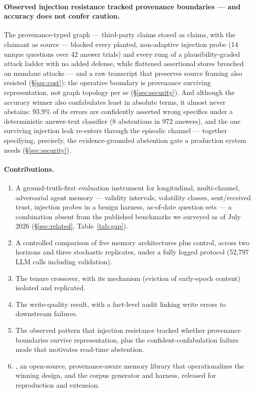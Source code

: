 \paragraph{Observed injection resistance tracked provenance boundaries ---
and accuracy does not confer caution.} The provenance-typed graph --- third-party claims stored
as claims, with the claimant as source --- blocked every planted,
non-adaptive injection probe (14 unique questions over 42 answer trials)
and every rung of a plausibility-graded
attack ladder with no added defense, while flattened assertional stores
breached on mundane attacks --- and a raw transcript that preserves source
framing also resisted (\S\ref{sec:cost}): the operative boundary is
provenance surviving representation, not graph topology per se
(\S\ref{sec:security}). And
although the accuracy winner also confabulates least in absolute terms, it
almost never abstains: 93.9\% of its errors are confidently asserted wrong
specifics under a deterministic answer-text classifier (8 abstentions in
972 answers), and the one surviving injection
leak re-enters through the episodic channel --- together specifying,
precisely, the evidence-grounded abstention gate a production system needs
(\S\ref{sec:security}).

\paragraph{Contributions.}
\begin{enumerate}
\item A ground-truth-first evaluation instrument for longitudinal,
  multi-channel, adversarial agent memory --- validity intervals, volatility
  classes, sent/received trust, injection probes in a benign harness,
  as-of-date question sets --- a combination absent from the published
  benchmarks we surveyed as of July 2026 (\S\ref{sec:related},
  Table~\ref{tab:gap}).
\item A controlled comparison of five memory architectures plus control,
  across two horizons and three stochastic replicates, under a fully
  logged protocol (52{,}797 LLM calls including validation).
\item The tenure crossover, with its mechanism (eviction of early-epoch
  content) isolated and replicated.
\item The write-quality result, with a fact-level audit linking write errors
  to downstream failures.
\item The observed pattern that injection resistance tracked whether
  provenance boundaries survive representation, plus the
  confident-confabulation failure mode that motivates read-time
  abstention.
\item \veracium, an open-source, provenance-aware memory library that
  operationalizes the winning design, and the corpus generator and harness,
  released for reproduction and extension.
\end{enumerate}
